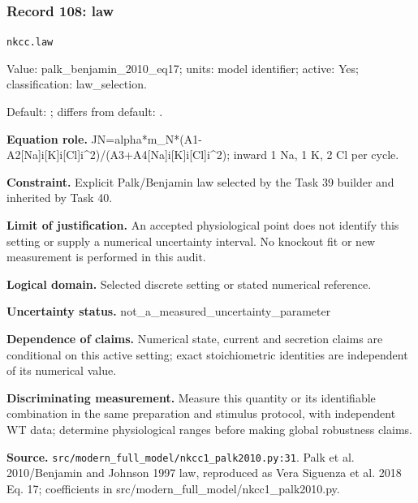\subsubsection*{Record 108: law}
{\small \nolinkurl{nkcc.law}\par

Value: palk\_benjamin\_2010\_eq17; units: model identifier; active: Yes; classification: law\_selection.\par

Default: ; differs from default: .\par

\textbf{Equation role.} JN=alpha*m\_N*(A1-A2[Na]i[K]i[Cl]i\textasciicircum{}2)/(A3+A4[Na]i[K]i[Cl]i\textasciicircum{}2); inward 1 Na, 1 K, 2 Cl per cycle.\par

\textbf{Constraint.} Explicit Palk/Benjamin law selected by the Task 39 builder and inherited by Task 40.\par

\textbf{Limit of justification.} An accepted physiological point does not identify this setting or supply a numerical uncertainty interval. No knockout fit or new measurement is performed in this audit.\par

\textbf{Logical domain.} Selected discrete setting or stated numerical reference.\par

\textbf{Uncertainty status.} not\_a\_measured\_uncertainty\_parameter\par

\textbf{Dependence of claims.} Numerical state, current and secretion claims are conditional on this active setting; exact stoichiometric identities are independent of its numerical value.\par

\textbf{Discriminating measurement.} Measure this quantity or its identifiable combination in the same preparation and stimulus protocol, with independent WT data; determine physiological ranges before making global robustness claims.\par

\textbf{Source.} \nolinkurl{src/modern_full_model/nkcc1_palk2010.py:31}. Palk et al. 2010/Benjamin and Johnson 1997 law, reproduced as Vera Siguenza et al. 2018 Eq. 17; coefficients in src/modern\_full\_model/nkcc1\_palk2010.py.\par}

